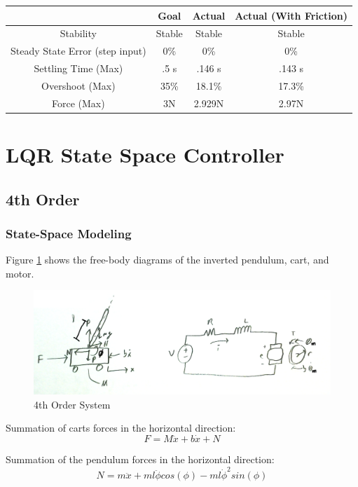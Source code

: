 \documentclass{article}
\begin{document}
\begin{center}
\begin{tabular}{|c | c | c | c|} 
\hline
 & Goal & Actual & Actual (With Friction)\\ 
\hline
Stability &  Stable & Stable & Stable\\ 
\hline
Steady State Error (step input)  & 0\% & 0\% & 0\%\\ 
\hline
Settling Time (Max) & .5 s & .146 s & .143 s \\
\hline
Overshoot (Max)& 35\% & 18.1\% & 17.3\% \\
\hline
Force (Max) & 3N & 2.929N & 2.97N\\
\hline
\end{tabular}
\end{center}

\section{LQR State Space Controller}
\subsection{4th Order}
\subsubsection{State-Space Modeling}
Figure \ref{fig:4thOrder} shows the free-body diagrams of the inverted pendulum, cart, and motor.

\begin{figure}[!htb]
\centering
\includegraphics[width=0.95\linewidth]{System4thOrder}
\caption{4th Order System}
\label{fig:4thOrder}
\end{figure}

Summation of carts forces in the horizontal direction:
\begin{equation} 
\label{eqn1}
F = M\ddot{x}+b\dot{x} + N
\end{equation}

Summation of the pendulum forces in the horizontal direction:
\begin{equation} 
\label{eqn2}
N = m\ddot{x}+m l \ddot{\phi} cos(\phi)-m l \dot{\phi}^2sin(\phi)
\end{equation}
\end{document}
